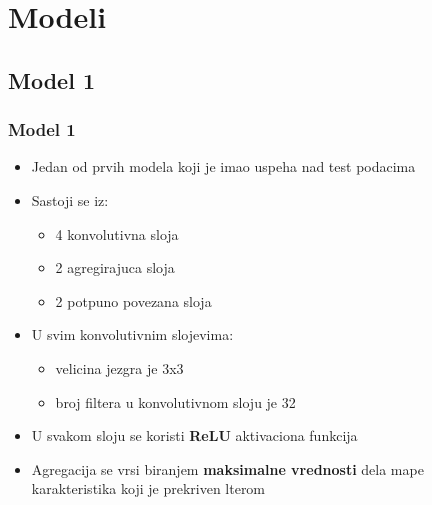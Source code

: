 \documentclass{beamer}
\begin{document}

\section{Modeli}

\subsection{Model 1}
\begin{frame}
\frametitle{Model 1}

\begin{itemize}

\item Jedan od prvih modela koji je imao uspeha nad test podacima
\item Sastoji se iz:
\begin{itemize}
\item 4 konvolutivna sloja
\item 2 agregirajuca sloja
\item 2 potpuno povezana sloja
\end{itemize}

\item U svim konvolutivnim slojevima:
\begin{itemize}
\item velicina jezgra je 3x3
\item broj filtera u konvolutivnom sloju je 32
\end{itemize}


\item U svakom sloju se koristi \textbf{ReLU} aktivaciona funkcija
\item Agregacija se vrsi biranjem \textbf{maksimalne vrednosti} dela mape karakteristika koji je prekriven lterom

\end{itemize}


\end{frame}
\end{document}
